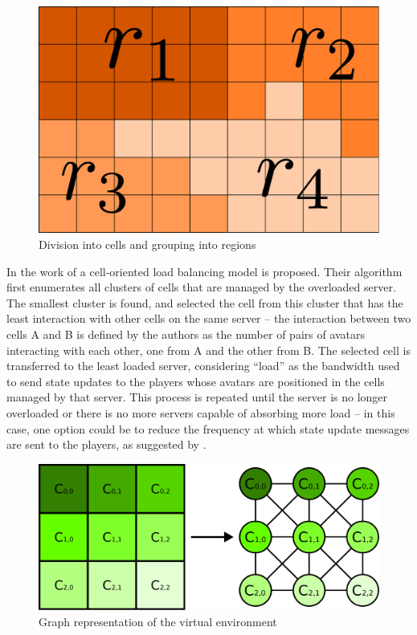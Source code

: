 \documentclass[acmjacm]{acmtrans2m}
\begin{document}
\begin{figure}[!t]
	\centering
	\includegraphics[width=0.4\linewidth]{images/macromicro}
	\caption{Division into cells and grouping into regions}
	\label{fig:cells}
\end{figure}

In the work of \cite{ahmed2008mol} a cell-oriented load balancing model is proposed. Their algorithm first enumerates all clusters of cells that are managed by the overloaded server. The smallest cluster is found, and selected the cell from this cluster that has the least interaction with other cells on the same server -- the interaction between two cells A and B is defined by the authors as the number of pairs of avatars interacting with each other, one from A and the other from B. The selected cell is transferred to the least loaded server, considering ``load'' as the bandwidth used to send state updates to the players whose avatars are positioned in the cells managed by that server. This process is repeated until the server is no longer overloaded or there is no more servers capable of absorbing more load -- in this case, one option could be to reduce the frequency at which state update messages are sent to the players, as suggested by \cite{bezerra2008a3}.

\begin{figure}[!t]
	\centering
	\includegraphics[width=0.7\linewidth]{images/grafo}
	\caption{Graph representation of the virtual environment}
	\label{fig:graph}
\end{figure}
\end{document}
